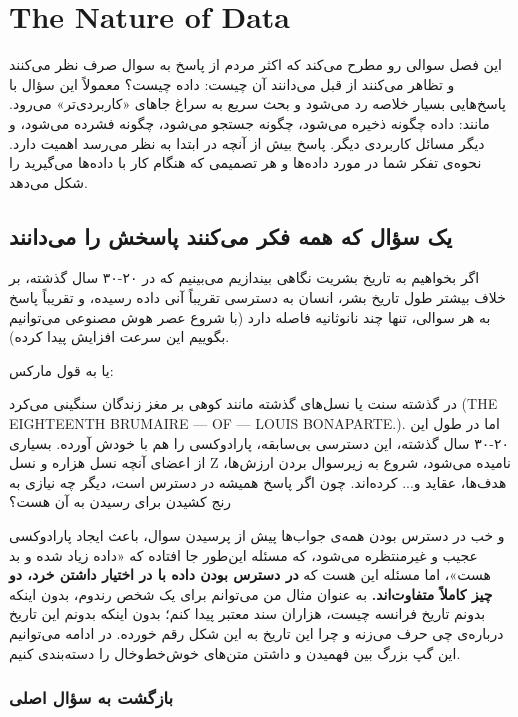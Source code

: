 \chapter{The Nature of Data}
\label{ch:nature-of-data}

این فصل سوالی رو مطرح می‌کند که اکثر مردم از پاسخ به سوال صرف نظر می‌کنند و تظاهر می‌کنند از قبل می‌دانند آن چیست: داده چیست؟
معمولاً این سؤال با پاسخ‌هایی بسیار خلاصه رد می‌شود و بحث سریع به سراغ جاهای «کاربردی‌تر» می‌رود. مانند:
داده چگونه ذخیره می‌شود، چگونه جستجو می‌شود، چگونه فشرده می‌شود، و دیگر مسائل کاربردی دیگر. پاسخ بیش از آنچه در ابتدا به نظر می‌رسد اهمیت دارد. نحوه‌ی تفکر شما در مورد داده‌ها و هر تصمیمی که هنگام کار با داده‌ها می‌گیرید را شکل می‌دهد.

\section{یک سؤال که همه فکر می‌کنند پاسخش را می‌دانند}
\label{sec:question-everyone-thinks-they-know}

اگر بخواهیم به تاریخ بشریت نگاهی بیندازیم می‌بینیم که در ۲۰-۳۰ سال گذشته، بر خلاف بیشتر طول تاریخ بشر، انسان به دسترسی تقریباً آنی داده رسیده، و تقریباً پاسخ به هر سوالی، تنها چند نانوثانیه فاصله دارد (با شروع عصر هوش مصنوعی می‌توانیم بگوییم این سرعت افزایش پیدا کرده).

یا به قول مارکس:

در گذشته سنت یا نسل‌های گذشته مانند کوهی بر مغز زندگان سنگینی می‌کرد (THE EIGHTEENTH BRUMAIRE — OF — LOUIS BONAPARTE.). اما در طول این ۲۰-۳۰ سال گذشته، این دسترسی بی‌سابقه، پارادوکسی را هم با خودش آورده. بسیاری از اعضای آنچه نسل هزاره و نسل Z نامیده می‌شود، شروع به زیرسوال بردن ارزش‌ها، هدف‌ها، عقاید و... کرده‌اند. چون اگر پاسخ همیشه در دسترس است، دیگر چه نیازی به رنج کشیدن برای رسیدن به آن هست؟

و خب در دسترس بودن همه‌ی جواب‌ها پیش از پرسیدن سوال، باعث ایجاد پارادوکسی عجیب و غیرمنتظره می‌شود، که مسئله این‌طور جا افتاده که «داده زیاد شده و بد هست»، اما مسئله این هست که \textbf{در دسترس بودن داده با در اختیار داشتن خرد، دو چیز کاملاً متفاوت‌اند.} به عنوان مثال من می‌توانم برای یک شخص رندوم، بدون اینکه بدونم تاریخ فرانسه چیست، هزاران سند معتبر پیدا کنم؛ بدون اینکه بدونم این تاریخ درباره‌ی چی حرف می‌زنه و چرا این تاریخ به این شکل رقم خورده. در ادامه می‌توانیم این گپ بزرگ بین فهمیدن و داشتن متن‌های خوش‌خط‌وخال را دسته‌بندی کنیم.

\subsection{بازگشت به سؤال اصلی}
\label{sub:return-to-main-question}

